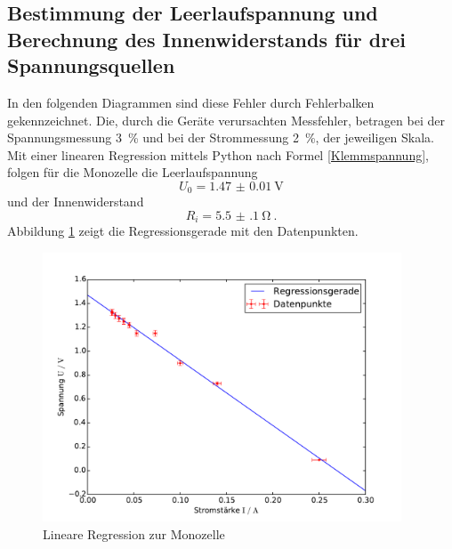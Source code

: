 \subsection{Bestimmung der Leerlaufspannung und Berechnung des Innenwiderstands für drei Spannungsquellen}
In den folgenden Diagrammen sind diese Fehler durch Fehlerbalken gekennzeichnet. Die, durch die Geräte verursachten Messfehler, betragen bei der Spannungsmessung \SI{3}{\%} und bei der Strommessung \SI{2}{\%}, der jeweiligen Skala. \\
Mit einer linearen Regression mittels Python nach Formel \eqref{Klemmspannung}, folgen für die Monozelle die Leerlaufspannung
\[U_0 = \SI{1.47(1)}{\volt}\]
und der Innenwiderstand
\[\label{Innenwiderstand_Monozelle}
R_i = \SI{5.5(1)}{\ohm} \ .\]
Abbildung \ref{fig:Regression_Monozelle} zeigt die Regressionsgerade mit den Datenpunkten.
\begin{figure}[h!]
	\centering
	\includegraphics[width=0.95\textwidth]{Spannung_Messung_b.pdf}
	\caption{Lineare Regression zur Monozelle}
	\label{fig:Regression_Monozelle}
\end{figure}


